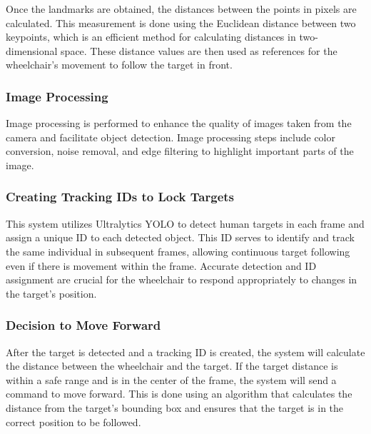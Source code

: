 Once the landmarks are obtained, the distances between the points in pixels are calculated. This measurement is done using the Euclidean distance between two keypoints, which is an efficient method for calculating distances in two-dimensional space. These distance values are then used as references for the wheelchair's movement to follow the target in front.

\vspace{5pt}
\subsubsection{Image Processing}
\label{subsubsec:imageprocessing}

Image processing is performed to enhance the quality of images taken from the camera and facilitate object detection. Image processing steps include color conversion, noise removal, and edge filtering to highlight important parts of the image.

\vspace{5pt}
\subsubsection*{Creating Tracking IDs to Lock Targets}
\label{subsubsec:trackingid}

This system utilizes Ultralytics YOLO to detect human targets in each frame and assign a unique ID to each detected object. This ID serves to identify and track the same individual in subsequent frames, allowing continuous target following even if there is movement within the frame. Accurate detection and ID assignment are crucial for the wheelchair to respond appropriately to changes in the target's position.

\vspace{5pt}
\subsubsection*{Decision to Move Forward}
\label{subsubsec:decisionmoveforward}

After the target is detected and a tracking ID is created, the system will calculate the distance between the wheelchair and the target. If the target distance is within a safe range and is in the center of the frame, the system will send a command to move forward. This is done using an algorithm that calculates the distance from the target's bounding box and ensures that the target is in the correct position to be followed.

